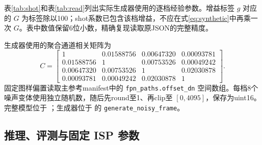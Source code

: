 表\ref{tab:shot}和表\ref{tab:read}列出实际生成器使用的逐档经验参数。增益标签 $g$ 对应的 $G$ 为标签除以100；shot系数已包含该档增益，不应在式\eqref{eq:synthetic}中再乘一次 $G$。表中数值保留6位小数，精确复现读取原JSON的完整精度。


生成器使用的聚合通道相关矩阵为
\begin{equation}
C=\begin{bmatrix}
1 & 0.01588756 & 0.00647320 & 0.00093781\\
0.01588756 & 1 & 0.00753526 & 0.00049242\\
0.00647320 & 0.00753526 & 1 & 0.02030878\\
0.00093781 & 0.00049242 & 0.02030878 & 1
\end{bmatrix}.
\end{equation}
固定图样偏置读取主参考manifest中的 \texttt{fpn\_paths.offset\_dn} 空间数组。每档8个噪声变体使用独立随机数，随后先round至1、再clip至 $[0,4095]$，保存为uint16。完整模型位于 ；生成器位于  的 \texttt{generate\_noisy\_frame}。

\subsection{推理、评测与固定 ISP 参数}

